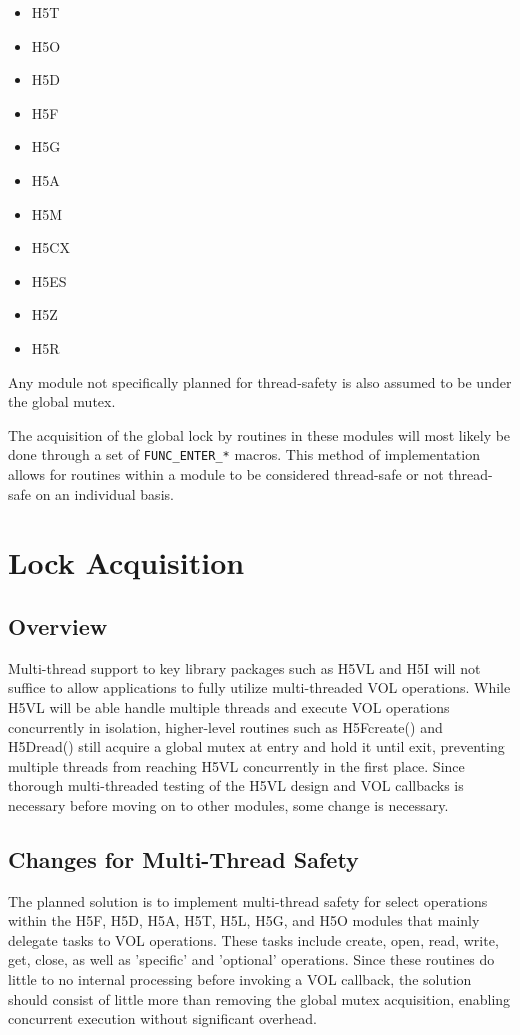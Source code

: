 \documentclass{article}
\begin{document}
\begin{itemize}
    \item H5T
    \item H5O
    \item H5D
    \item H5F
    \item H5G
    \item H5A
    \item H5M
    \item H5CX
    \item H5ES
    \item H5Z
    \item H5R
\end{itemize}

Any module not specifically planned for thread-safety is also assumed to be under the global mutex. 

The acquisition of the global lock by routines in these modules will most likely be done through a set of \texttt{FUNC\_ENTER\_*} macros. This method of implementation allows for routines within a module to be considered thread-safe or not thread-safe on an individual basis. 

\section{Lock Acquisition}
\label{sec:locks-outside}

\subsection{Overview}

Multi-thread support to key library packages such as H5VL and H5I will not suffice to allow applications to fully utilize multi-threaded VOL operations. While H5VL will be able handle multiple threads and execute VOL operations concurrently in isolation, higher-level routines such as H5Fcreate() and H5Dread() still acquire a global mutex at entry and hold it until exit, preventing multiple threads from reaching H5VL concurrently in the first place. Since thorough multi-threaded testing of the H5VL design and VOL callbacks is necessary before moving on to other modules, some change is necessary.

\subsection{Changes for Multi-Thread Safety}

The planned solution is to implement multi-thread safety for select operations within the H5F, H5D, H5A, H5T, H5L, H5G, and H5O modules that mainly delegate tasks to VOL operations. These tasks include create, open, read, write, get, close, as well as 'specific' and 'optional' operations. Since these routines do little to no internal processing before invoking a VOL callback, the solution should consist of little more than removing the global mutex acquisition, enabling concurrent execution without significant overhead.
\end{document}
